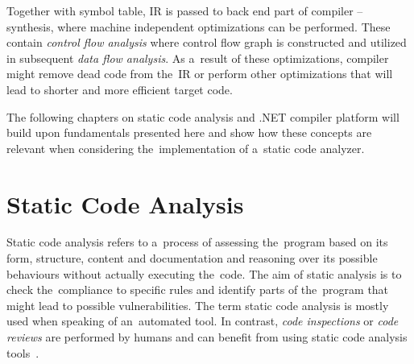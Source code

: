\documentclass[
  digital, %
  table,   %
  lof,     %
  lot,     %
  oneside,
]{fithesis3}
\begin{document}
\bigskip
Together with symbol table, IR is passed to back end part of compiler -- synthesis, where machine independent optimizations can be performed. These contain \textit{control flow analysis} where control flow graph is constructed and utilized in subsequent \textit{data flow analysis}. As a~result of these optimizations, compiler might remove dead code from the~IR or perform other optimizations that will lead to shorter and more efficient target code.

\bigskip
The following chapters on static code analysis and .NET compiler platform will build upon fundamentals presented here and show how these concepts are relevant when considering the~implementation of a~static code analyzer.

\chapter{Static Code Analysis}
\label{chap:static-code-analysis}
Static code analysis refers to a~process of assessing the~program based on its form, structure, content and documentation and reasoning over its possible behaviours without actually executing the~code. The aim of static analysis is to check the~compliance to specific rules and identify parts of the~program that might lead to possible vulnerabilities. The term static code analysis is mostly used when speaking of an~automated tool. In contrast, \textit{code inspections} or \textit{code reviews} are performed by humans and can benefit from using static code analysis tools~\cite{oswap-sca, ppt-sca}.
\end{document}
